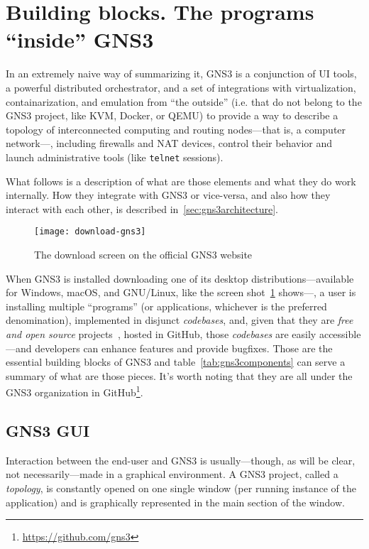 \section{Building blocks. The programs ``inside'' GNS3}
\label{sec:gns3buildingblocks}

In an extremely naive way of summarizing it, GNS3 is a conjunction of UI tools, a powerful distributed orchestrator, and a set of integrations with virtualization, containarization, and emulation from ``the outside'' (i.e. that do not belong to the GNS3 project, like KVM, Docker, or QEMU) to provide a way to describe a topology of interconnected computing and routing nodes---that is, a computer network---, including firewalls and NAT devices, control their behavior and launch administrative tools (like \texttt{telnet} sessions).

What follows is a description of what are those elements and what they do work internally.
How they integrate with GNS3 or vice-versa, and also how they interact with each other, is described in~\ref{sec:gns3architecture}.

\begin{figure}
  \centering
  \texttt{[image: download-gns3]}
  \caption{The download screen on the official GNS3 website}
  \label{fig:download-gns3}
\end{figure}

When GNS3 is installed downloading one of its desktop distributions---available for Windows, macOS, and GNU/Linux, like the screen shot~\ref{fig:download-gns3} shows---, a user is installing multiple ``programs'' (or applications, whichever is the preferred denomination), implemented in disjunct \emph{codebases}, and, given that they are \emph{free and open source} projects~\cite{gplv3}, hosted in GitHub, those \emph{codebases} are easily accessible---and developers can enhance features and provide bugfixes. Those are the essential building blocks of GNS3 and table~\ref{tab:gns3components} can serve a summary of what are those pieces.
It's worth noting that they are all under the GNS3 organization in GitHub\footnote{\url{https://github.com/gns3}}.



\subsection{GNS3 GUI}
\label{subsec:gns3gui}

Interaction between the end-user and GNS3 is usually---though, as will be clear, not necessarily---made in a graphical environment.
A GNS3 project, called a \emph{topology}, is constantly opened on one single window (per running instance of the application) and is graphically represented in the main section of the window.

